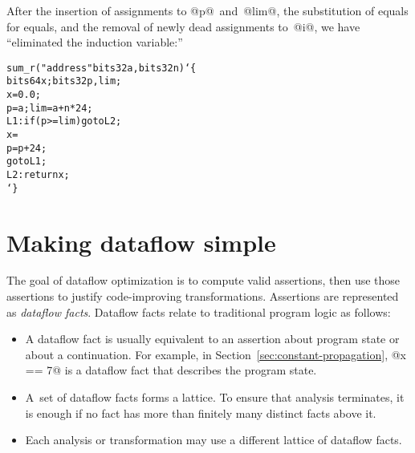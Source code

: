 \documentclass[blockstyle,preprint,natbib,nocopyrightspace]{sigplanconf}
\newcommand\lbr{\char`\{}
\newcommand\rbr{\char`\}}
\newcommand\secref[1]{Section~\ref{sec:#1}}
\newcommand\seclabel[1]{\label{sec:#1}}
\begin{document}
After the insertion of assignments to @p@~and~@lim@, the substitution
of equals for equals, and the removal of newly dead assignments
to~@i@, we have ``eliminated the induction variable:''
\begin{alltt}
sum_r("address" bits32 a, bits32 n) \lbr
     bits64 x; bits32 p, lim;
     x = 0.0;
     p = a; lim = a + n * 24;
 L1: if ({p >= lim}) goto L2;
     x = %fadd(x, bits64[{p}]);
     p = p + 24;
     goto L1;
 L2: return x; 
\rbr
\end{alltt}

  
\ifpagetuning \enlargethispage{1\baselineskip} \fi 

\section {Making dataflow simple}

\seclabel{making-simple}

\seclabel{create-analysis}

The goal of dataflow optimization is to compute valid
assertions, then use those assertions to justify code-improving
transformations.
%
%
Assertions are represented as
\emph{dataflow facts}.
Dataflow facts relate to
 traditional 
program logic as follows:
\begin{itemize}
\item
A dataflow fact is usually equivalent to an assertion about program state or
about a continuation.
For example, in \secref{constant-propagation}, @x == 7@ is a dataflow
fact that describes the program state. 


\item
A~set of dataflow facts forms a lattice.
To ensure that analysis terminates,
it is enough if
no fact has more than finitely many distinct facts above it.
\item
Each analysis or transformation may use a different lattice of
dataflow facts.
\end{itemize}
\end{document}
